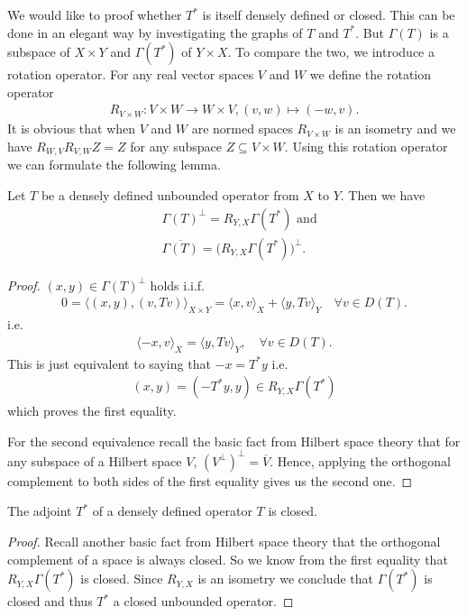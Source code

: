 \documentclass[../master_thesis.tex]{subfiles}
\begin{document}
We would like to proof whether $T^*$ is itself densely defined or closed. 
This can be done in an elegant way by investigating the graphs of $T$ and 
$T^*$. But $\Gamma(T)$ is a subspace of $X\times Y$ and 
$\Gamma(T^*)$ of $Y\times X$. To compare the two, we introduce a rotation operator. 
For any real vector spaces $V$ and $W$ we define the rotation operator 
\begin{align*}
    R_{V\times W}: V\times W \rightarrow W \times V, (v,w) \mapsto (-w,v).
\end{align*}
It is obvious that when $V$ and $W$ are normed spaces $R_{V\times W}$ is an isometry 
and we have $R_{W,V}R_{V,W}Z = Z$ for any subspace $Z\subseteq V\times W$.
Using this rotation operator we can formulate the following lemma.
\begin{lemma}\label{lem:rotated_graph}
    Let $T$ be a densely defined unbounded operator from $X$ to $Y$. 
    Then we have 
    \begin{align*}
        & \Gamma(T)^\perp = R_{Y,X}\Gamma(T^*) \text{ and}
        \\ &\overline{\Gamma(T)} = \big(R_{Y,X}\Gamma(T^*)\big)^\perp.
    \end{align*}
\end{lemma}
\begin{proof}
    $(x,y) \in \Gamma(T)^\perp$ holds i.i.f. 
    \begin{align*}
        0 = \langle (x,y), (v,Tv) \rangle _{X\times Y}
        = \langle x, v \rangle _X + \langle y, Tv \rangle _Y
            \quad \forall v \in D(T).
    \end{align*}
    i.e. 
    \begin{align*}
        \langle -x, v \rangle _X = \langle y, Tv \rangle _Y,
            \quad \forall v \in D(T).
    \end{align*}
    This is just equivalent to saying that $-x = T^*y$ i.e.
    \begin{align*}
        (x,y) = (-T^*y,y) \in R_{Y,X}\Gamma(T^*)
    \end{align*}
    which proves the first equality.

    For the second equivalence recall the basic fact from Hilbert space theory
    that for any subspace of a Hilbert space $V$,
    $(V^\perp)^\perp = \overline{V}$. Hence, applying the orthogonal 
    complement to both sides of the first equality gives us the second one.
\end{proof}

\begin{corollary}\label{cor:adjoint_of_densely_defined}
    The adjoint $T^*$ of a densely defined operator $T$ is closed. 
\end{corollary}
\begin{proof}
    Recall another basic fact from Hilbert space theory that the 
    orthogonal complement of a space is always closed. 
    So we know from the first equality that $R_{Y,X}\Gamma(T^*)$ is closed.
    Since $R_{Y,X}$ is an isometry we conclude that $\Gamma(T^*)$ is closed and 
    thus $T^*$ a closed unbounded operator.
\end{proof}
\end{document}
